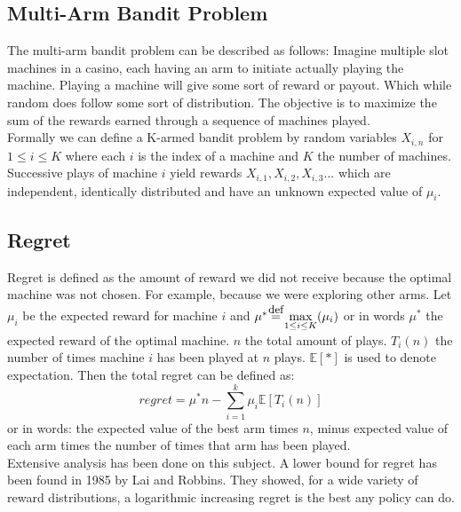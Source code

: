\documentclass[
11pt, %
english, %
singlespacing, %
headsepline, %
]{MastersDoctoralThesis} %
\newcommand\defeq{\stackrel{\mathclap{\small\mbox{def}}}{=}}
\newcommand\IE{\mathbb{E}}
\begin{document}
\subsection{Multi-Arm Bandit Problem}
The multi-arm bandit problem can be described as follows: Imagine multiple slot machines in a casino, each having an arm to initiate actually playing the machine. Playing a machine will give some sort of reward or payout. Which while random does follow some sort of distribution. The objective is to maximize the sum of the rewards earned through a sequence of machines played.\\

Formally we can define a K-armed bandit problem by random variables $X_{i,n}$ for $1 \leq i \leq K$ where each $i$ is the index of a machine and $K$ the number of machines. Successive plays of machine $i$ yield rewards $X_{i,1},X_{i,2},X_{i,3}...$ which are independent, identically distributed and have an unknown expected value of $\mu_i$.

\subsection{Regret}
Regret is defined as the amount of reward we did not receive because the optimal machine was not chosen. For example, because we were exploring other arms. Let $\mu_i$ be the expected reward for machine $i$ and $\mu^{*} \defeq \max\limits_{1 \leq i \leq K} (\mu_i)$ or in words $\mu^{*}$ the expected reward of the optimal machine. $n$ the total amount of plays. $T_i(n)$ the number of times machine $i$ has been played at $n$ plays. $\IE[*]$ is used to denote expectation. Then the total regret can be defined as:
\[
    regret = \mu^*n - \sum_{i=1}^{k}\mu_i\IE[T_i(n)]
\]
or in words: the expected value of the best arm times $n$, minus expected value of each arm times the number of times that arm has been played.\\

Extensive analysis has been done on this subject. A lower bound for regret has been found in 1985 by Lai and Robbins\cite{Lai+Robbins:1985}. They showed, for a wide variety of reward distributions, a logarithmic increasing regret is the best any policy can do. 
\end{document}
